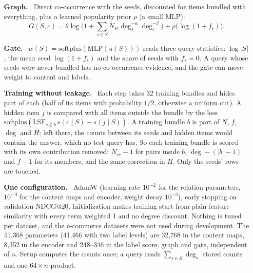 \documentclass[runningheads]{llncs}
\renewcommand{\paragraph}[1]{\smallskip\noindent\textbf{#1}\ }
\begin{document}
\paragraph{Graph.} Direct co-occurrence with the seeds, discounted for items bundled with everything, plus a learned
popularity prior $\rho$ (a small MLP):
\begin{equation}
G(S,c)=\theta\log\Big(1+\textstyle\sum_{s\in S}N_{sc}\deg_s^{-\alpha}\deg_c^{-\beta}\Big)+\rho\big(\log(1+f_c)\big).
\end{equation}

\paragraph{Gate.} $w(S)=\mathrm{softplus}(\mathrm{MLP}(u(S)))$ reads three query statistics: $\log|S|$, the mean seed
$\log(1+f_s)$ and the share of seeds with $f_s=0$. A query whose seeds were never bundled has no co-occurrence
evidence, and the gate can move weight to content and labels.

\paragraph{Training without leakage.} Each step takes 32 training bundles and hides part of each (half of its items
with probability $1/2$, otherwise a uniform cut). A hidden item $j$ is compared with all items outside the bundle by
the loss $\mathrm{softplus}(\mathrm{LSE}_{c\notin b}\,s(c\mid S)-s(j\mid S))$. A training bundle $b$ is part of $N$,
$f$, $\deg$ and $H$; left there, the counts between its seeds and hidden items would contain the answer, which no test
query has. So each training bundle is scored with its own contribution removed: $N_{sc}-1$ for pairs inside $b$,
$\deg-(|b|-1)$ and $f-1$ for its members, and the same correction in $H$. Only the seeds' rows are touched.

\paragraph{One configuration.} AdamW \cite{adamw} (learning rate $10^{-2}$ for the relation parameters, $10^{-3}$ for
the content maps and encoder, weight decay $10^{-3}$), early stopping on validation NDCG@20. Initialization makes
training start from plain feature similarity with every term weighted 1 and no degree discount. Nothing is tuned per
dataset, and the e-commerce datasets were not used during development. The 41,368 parameters (41,466 with two label
levels) are 32,768 in the content maps, 8,352 in the encoder and 248--346 in the label score, graph and gate,
independent of $n$. Setup computes the counts once; a query reads $\sum_{s\in S}\deg_s$ stored counts and one
$64\times n$ product.
\end{document}
